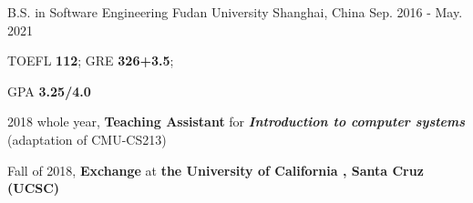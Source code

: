 

\begin{cventries}

  \cventry
    {B.S. in Software Engineering} %
    {Fudan University} %
    {Shanghai, China} %
    {Sep. 2016 - May. 2021} %
    {
      \begin{cvitems} %
        \item {TOEFL \textbf{112}; GRE \textbf{326+3.5};}
        \item {GPA \textbf{3.25/4.0}}
        \item {2018 whole year,  \textbf{Teaching Assistant} for \textbf{\textit{Introduction to computer systems}} (adaptation of CMU-CS213)}
        \item {Fall of 2018, \textbf{Exchange} at \textbf{the University of California ,  Santa Cruz (UCSC)} }
      \end{cvitems}
    }

\end{cventries}
